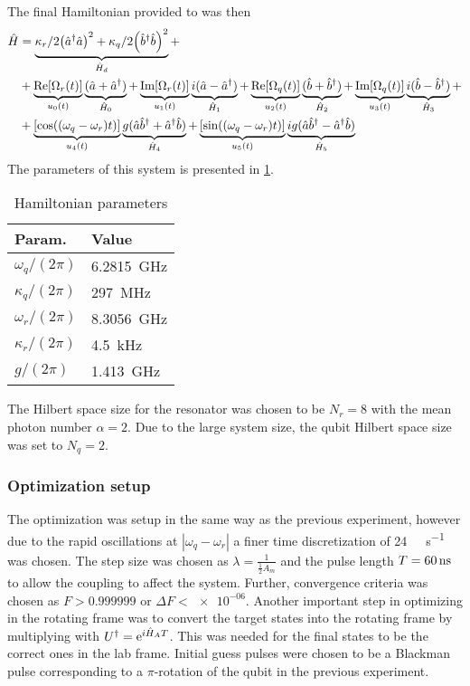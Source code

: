 \documentclass[main.tex]{subfiles}
\begin{document}
The final Hamiltonian provided to \krotov{} was then
\begin{equation}
    \begin{split}
        \hat{H} &= \underbrace{\kappa_r/2\qty(\hat{a}^\dagger\hat{a})^2 +\kappa_q/2\qty(\hat{b}^\dagger\hat{b})^2}_{\hat{H}_d} + \\
        &+\underbrace{\text{Re}\qty[\Omega_r(t)]}_{u_0(t)}\underbrace{(\hat{a} + \hat{a}^\dagger)}_{\hat{H}_0} + \underbrace{\text{Im}\qty[\Omega_r(t)]}_{u_1(t)}\underbrace{i(\hat{a} - \hat{a}^\dagger)}_{\hat{H}_1} + \underbrace{\text{Re}\qty[\Omega_q(t)]}_{u_2(t)}\underbrace{(\hat{b} + \hat{b}^\dagger)}_{\hat{H}_2} + \underbrace{\text{Im}\qty[\Omega_q(t)]}_{u_3(t)}\underbrace{i(\hat{b} - \hat{b}^\dagger)}_{\hat{H}_3} +\\
        &+\underbrace{\qty[\cos((\omega_q-\omega_r)t)]}_{u_4(t)}\underbrace{g(\hat{a}\hat{b}^\dagger + \hat{a}^\dagger\hat{b})}_{\hat{H}_4} + \underbrace{\qty[\sin((\omega_q-\omega_r)t)]}_{u_5(t)}\underbrace{ig(\hat{a}\hat{b}^\dagger - \hat{a}^\dagger\hat{b})}_{\hat{H}_5}
        \label{eq:cat-hamiltonian-rotating}
    \end{split}
\end{equation}
The parameters of this system is presented in \cref{tab:ham-params}.
\begin{table}[H]
    \caption{Hamiltonian parameters}%
    \label{tab:ham-params}
    \centering
    \begin{tabular}{@{}ll@{}}
    \toprule
    Param. & Value\\ \midrule
    \(\omega_q/(2\pi)\) & \SI{6.2815}{\giga\hertz} \\
    \(\kappa_q/(2\pi)\) & \SI{297}{\mega\hertz} \\
    \(\omega_r/(2\pi)\) & \SI{8.3056}{\giga\hertz} \\
    \(\kappa_r/(2\pi)\) & \SI{4.5}{\kilo\hertz} \\
    \(g/(2\pi)\) & \SI{1.413}{\giga\hertz} \\
    \bottomrule
    \end{tabular}
\end{table}
The Hilbert space size for the resonator was chosen to be \( N_r = 8 \) with the mean photon number \(\alpha = 2\).
Due to the large system size, the qubit Hilbert space size was set to \(N_q = 2\).

\subsubsection{Optimization setup}
The optimization was setup in the same way as the previous experiment, however due to the rapid oscillations at \(|\omega_q-\omega_r|\) a finer time discretization of \SI{24}{\giga\samples\per\second} was chosen.
The step size was chosen as \(\lambda = \frac{1}{\frac{1}{2}A_{m}}\) and the pulse length \(T = \SI{60}{\nano\second}\) to allow the coupling to affect the system.
Further, convergence criteria was chosen as \(F>0.999999\) or \(\Delta F < \num{e-06}\).
Another important step in optimizing in the rotating frame was to convert the target states into the rotating frame by multiplying with \(U^\dagger = \mathrm{e}^{i\hat{H}_A T}\).
This was needed for the final states to be the correct ones in the lab frame.
Initial guess pulses were chosen to be a Blackman pulse corresponding to a \(\pi\)-rotation of the qubit in the previous experiment.
\end{document}
